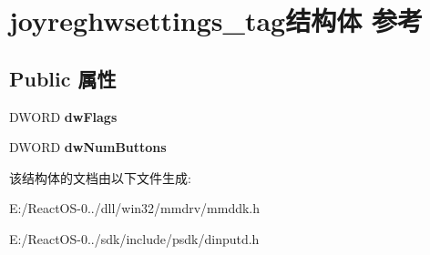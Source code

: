 \hypertarget{structjoyreghwsettings__tag}{}\section{joyreghwsettings\+\_\+tag结构体 参考}
\label{structjoyreghwsettings__tag}
\subsection*{Public 属性}
\begin{DoxyCompactItemize}
\item 
\mbox{\label{structjoyreghwsettings__tag_a438d77c7cfb82c63d923adc5ec777cd3}} 
D\+W\+O\+RD {\bfseries dw\+Flags}
\item 
\mbox{\label{structjoyreghwsettings__tag_a2082621aabe8a5564b6dda6ecc5e8c02}} 
D\+W\+O\+RD {\bfseries dw\+Num\+Buttons}
\end{DoxyCompactItemize}


该结构体的文档由以下文件生成\+:\begin{DoxyCompactItemize}
\item 
E\+:/\+React\+O\+S-\/0../dll/win32/mmdrv/mmddk.\+h\item 
E\+:/\+React\+O\+S-\/0../sdk/include/psdk/dinputd.\+h\end{DoxyCompactItemize}
